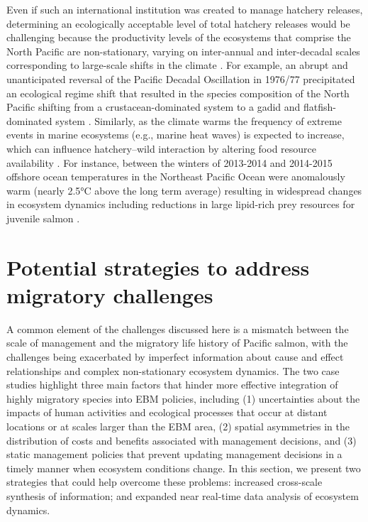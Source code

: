 Even if such an international institution was created to manage hatchery
releases, determining an ecologically acceptable level of total hatchery
releases would be challenging because the productivity levels of the
ecosystems that comprise the North Pacific are non-stationary, varying
on inter-annual and inter-decadal scales corresponding to large-scale
shifts in the climate \citep{Hare1999a, Chavez2003a}. For example, an
abrupt and unanticipated reversal of the Pacific Decadal Oscillation in
1976/77 precipitated an ecological regime shift that resulted in the
species composition of the North Pacific shifting from a
crustacean-dominated system to a gadid and flatfish-dominated system
\citep{Mantua1997a, Anderson1999a, Mueter2000a}. Similarly, as the
climate warms the frequency of extreme events in marine ecosystems
(e.g., marine heat waves) is expected to increase, which can influence
hatchery--wild interaction by altering food resource availability
\citep{Jentsch2007, DiLorenzo2016}. For instance, between the winters of
2013-2014 and 2014-2015 offshore ocean temperatures in the Northeast
Pacific Ocean were anomalously warm (nearly 2.5°C above the long term
average) resulting in widespread changes in ecosystem dynamics including
reductions in large lipid-rich prey resources for juvenile salmon
\citep{Bond2015, DiLorenzo2016}.



\section{Potential strategies to address migratory challenges}

A common element of the challenges discussed here is a mismatch between
the scale of management and the migratory life history of Pacific
salmon, with the challenges being exacerbated by imperfect information
about cause and effect relationships and complex non-stationary
ecosystem dynamics. The two case studies highlight three main factors
that hinder more effective integration of highly migratory species into
EBM policies, including (1) uncertainties about the impacts of human
activities and ecological processes that occur at distant locations or
at scales larger than the EBM area, (2) spatial asymmetries in the
distribution of costs and benefits associated with management decisions,
and (3) static management policies that prevent updating management
decisions in a timely manner when ecosystem conditions change. In this
section, we present two strategies that could help overcome these
problems: increased cross-scale synthesis of information; and expanded
near real-time data analysis of ecosystem dynamics.


